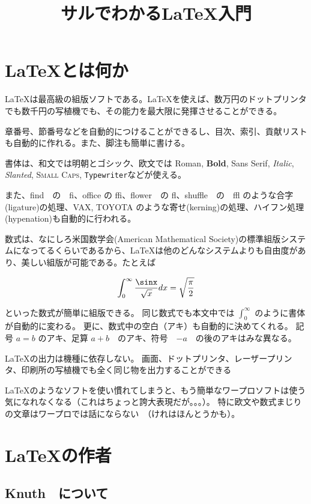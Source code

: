 \documentclass[a4j]{article}
\begin{document}
\title{サルでわかる\LaTeX 入門}
\author{}
\date{}

\maketitle 

\section{\LaTeX とは何か}

\LaTeX は最高級の組版ソフトである。\LaTeX を使えば、数万円のドットプリンタでも数千円の写植機でも、その能力を最大限に発揮させることができる。

章番号、節番号などを自動的につけることができるし、目次、索引、貢献リストも自動的に作れる。また、脚注も簡単に書ける。

書体は、和文では明朝とゴシック、欧文では Roman, \textbf{Bold}, \textsf{Sans Serif}, \textit{Italic}, \textsl{Slanted}, \textsc{Small Caps}, \texttt{Typewriter}などが使える。

また、find　の　fi、office の ffi、flower　の fl、shuffle　の　ffl のような合字(ligature)の処理、VAX, TOYOTA のような寄せ(kerning)の処理、ハイフン処理(hypenation)も自動的に行われる。

数式は、なにしろ米国数学会(American Mathematical Society)の標準組版システム\cite{Rate06}になってるくらいであるから、\LaTeX は他のどんなシステムよりも自由度があり、美しい組版が可能である。たとえば

\[\int_0^\infty \frac{\sinx}{\sqrt{x}}dx
	= \sqrt{\frac{\pi}{2}}\]

といった数式が簡単に組版できる。
同じ数式でも本文中では $\int_0^\infty$ のように書体が自動的に変わる。
更に、数式中の空白（アキ）も自動的に決めてくれる。
記号 $a=b$ のアキ、足算 $a+b$　のアキ、符号　$-a$　の後のアキはみな異なる。

\LaTeX の出力は機種に依存しない。
画面、ドットプリンタ、レーザープリンタ、印刷所の写植機でも全く同じ物を出力することができる\cite{HM99}

\LaTeX のようなソフトを使い慣れてしまうと、もう簡単なワープロソフトは使う気になれなくなる（これはちょっと誇大表現だが。。。）。
特に欧文や数式まじりの文章はワープロでは話にならない　（けれはほんとうかも）。

\section{\LaTeX の作者}

\subsection{Knuth　について}
\end{document}
